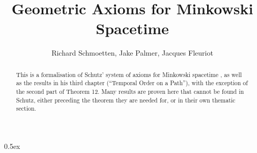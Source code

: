 \documentclass[11pt,a4paper]{article}
\begin{document}
\title{Geometric Axioms for Minkowski Spacetime}
\author{Richard Schmoetten, Jake Palmer, Jacques Fleuriot}
\maketitle
\begin{abstract}
This is a formalisation of Schutz' system of axioms for Minkowski spacetime \cite{schutz1997}, as well as the results in his third chapter (``Temporal Order on a Path''), with the exception of the second part of Theorem 12. Many results are proven here that cannot be found in Schutz, either preceding the theorem they are needed for, or in their own thematic section.
\end{abstract}

\tableofcontents\newpage

\parindent 0pt\parskip 0.5ex

%
\newpage
\newpage





\end{document}
